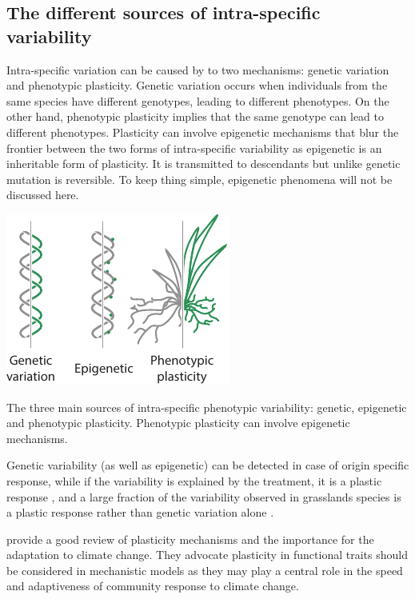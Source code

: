 \subsection{The different sources of intra-specific variability}

Intra-specific variation can be caused by to two mechanisms: genetic variation and phenotypic plasticity. Genetic variation occurs when individuals from the same species have different genotypes, leading to different phenotypes. On the other hand, phenotypic plasticity implies that the same genotype can lead to different phenotypes. Plasticity can involve epigenetic mechanisms \parencite{
zhang_epigenetic_2013, nicotra_adaptive_2015, beaman_evolution_2016} that blur the frontier between the two forms of intra-specific variability as epigenetic is an inheritable form of plasticity. It is transmitted to descendants but unlike genetic mutation is reversible. To keep thing simple, epigenetic phenomena will not be discussed here.

\begin{marginfigure}
    \includegraphics{./1_Introduction/graphics/sources.pdf}
  \caption[Sources of intra-specific variability]{The three main sources of intra-specific phenotypic variability: genetic, epigenetic and phenotypic plasticity. Phenotypic plasticity can involve epigenetic mechanisms.}
  \label{fg:insurance}
\end{marginfigure}

Genetic variability (as well as epigenetic) can be detected in case of origin specific response, while if the variability is explained by the treatment, it is a plastic response \parencite{frei_plastic_2014}, and a large fraction of the variability observed in grasslands species is a plastic response rather than genetic variation alone \parencite{frei_plastic_2014, merila_climate_2014}.

\cite{nicotra_plant_2010} provide a good review of plasticity mechanisms and the importance for the adaptation to climate change. They advocate plasticity in functional traits should be considered in mechanistic models as they may play a central role in the speed and adaptiveness of community response to climate change.


